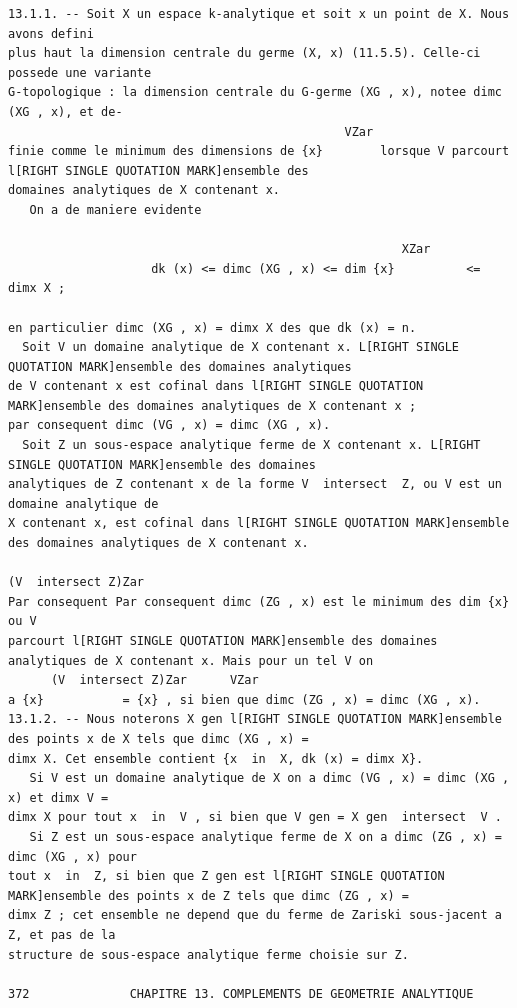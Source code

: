 \documentclass[
  11pt,
]{article}
\begin{document}
\begin{lstlisting}
13.1.1. -- Soit X un espace k-analytique et soit x un point de X. Nous avons defini
plus haut la dimension centrale du germe (X, x) (11.5.5). Celle-ci possede une variante
G-topologique : la dimension centrale du G-germe (XG , x), notee dimc (XG , x), et de-
                                               VZar
finie comme le minimum des dimensions de {x}        lorsque V parcourt l[RIGHT SINGLE QUOTATION MARK]ensemble des
domaines analytiques de X contenant x.
   On a de maniere evidente

                                                       XZar
                    dk (x) <= dimc (XG , x) <= dim {x}          <= dimx X ;

en particulier dimc (XG , x) = dimx X des que dk (x) = n.
  Soit V un domaine analytique de X contenant x. L[RIGHT SINGLE QUOTATION MARK]ensemble des domaines analytiques
de V contenant x est cofinal dans l[RIGHT SINGLE QUOTATION MARK]ensemble des domaines analytiques de X contenant x ;
par consequent dimc (VG , x) = dimc (XG , x).
  Soit Z un sous-espace analytique ferme de X contenant x. L[RIGHT SINGLE QUOTATION MARK]ensemble des domaines
analytiques de Z contenant x de la forme V  intersect  Z, ou V est un domaine analytique de
X contenant x, est cofinal dans l[RIGHT SINGLE QUOTATION MARK]ensemble des domaines analytiques de X contenant x.
                                                                          (V  intersect Z)Zar
Par consequent Par consequent dimc (ZG , x) est le minimum des dim {x}              ou V
parcourt l[RIGHT SINGLE QUOTATION MARK]ensemble des domaines analytiques de X contenant x. Mais pour un tel V on
      (V  intersect Z)Zar      VZar
a {x}           = {x} , si bien que dimc (ZG , x) = dimc (XG , x).
13.1.2. -- Nous noterons X gen l[RIGHT SINGLE QUOTATION MARK]ensemble des points x de X tels que dimc (XG , x) =
dimx X. Cet ensemble contient {x  in  X, dk (x) = dimx X}.
   Si V est un domaine analytique de X on a dimc (VG , x) = dimc (XG , x) et dimx V =
dimx X pour tout x  in  V , si bien que V gen = X gen  intersect  V .
   Si Z est un sous-espace analytique ferme de X on a dimc (ZG , x) = dimc (XG , x) pour
tout x  in  Z, si bien que Z gen est l[RIGHT SINGLE QUOTATION MARK]ensemble des points x de Z tels que dimc (ZG , x) =
dimx Z ; cet ensemble ne depend que du ferme de Zariski sous-jacent a Z, et pas de la
structure de sous-espace analytique ferme choisie sur Z.

372              CHAPITRE 13. COMPLEMENTS DE GEOMETRIE ANALYTIQUE
\end{lstlisting}
\end{document}
